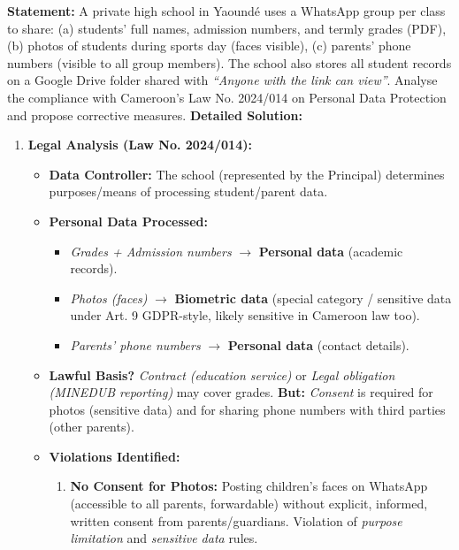 \documentclass[11pt]{article}
\begin{document}
\begin{exoresolu}
    \textbf{Statement:} A private high school in Yaoundé uses a WhatsApp group per class to share: (a) students' full names, admission numbers, and termly grades (PDF), (b) photos of students during sports day (faces visible), (c) parents' phone numbers (visible to all group members). The school also stores all student records on a Google Drive folder shared with \textit{``Anyone with the link can view''}. Analyse the compliance with Cameroon's Law No. 2024/014 on Personal Data Protection and propose corrective measures.
    \tcblower
    \textbf{Detailed Solution:}
    \begin{enumerate}
        \item \textbf{Legal Analysis (Law No. 2024/014):}
              \begin{itemize}
                  \item \textbf{Data Controller:} The school (represented by the Principal) determines purposes/means of processing student/parent data.
                  \item \textbf{Personal Data Processed:}
                        \begin{itemize}
                            \item \textit{Grades + Admission numbers} $\rightarrow$ \textbf{Personal data} (academic records).
                            \item \textit{Photos (faces)} $\rightarrow$ \textbf{Biometric data} (special category / sensitive data under Art. 9 GDPR-style, likely sensitive in Cameroon law too).
                            \item \textit{Parents' phone numbers} $\rightarrow$ \textbf{Personal data} (contact details).
                        \end{itemize}
                  \item \textbf{Lawful Basis?} \textit{Contract (education service)} or \textit{Legal obligation (MINEDUB reporting)} may cover grades. \textbf{But:} \textit{Consent} is required for photos (sensitive data) and for sharing phone numbers with third parties (other parents).
                  \item \textbf{Violations Identified:}
                        \begin{enumerate}
                            \item \textbf{No Consent for Photos:} Posting children's faces on WhatsApp (accessible to all parents, forwardable) without explicit, informed, written consent from parents/guardians. Violation of \textit{purpose limitation} and \textit{sensitive data} rules.

\end{enumerate}
\end{itemize}
\end{enumerate}
\end{exoresolu}
\end{document}
